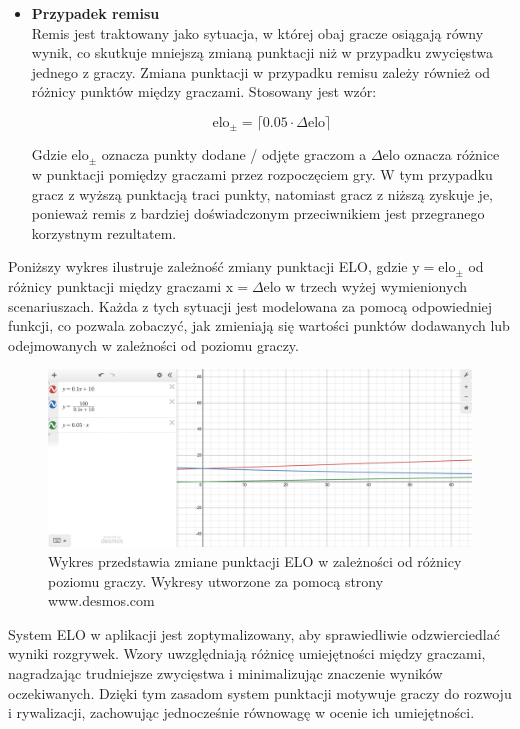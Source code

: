 \documentclass[12pt,a4paper]{article}
\begin{document}
\begin{itemize}
    \item \textbf{Przypadek remisu}\\
    Remis jest traktowany jako sytuacja, w której obaj gracze osiągają równy wynik, co skutkuje mniejszą zmianą punktacji niż w przypadku zwycięstwa jednego z graczy. Zmiana punktacji w przypadku remisu zależy również od różnicy punktów między graczami. Stosowany jest wzór:

    \[ \text{elo}_{\pm} = \lceil 0.05 \cdot \Delta \text{elo} \rceil \]

    Gdzie $ \text{elo}_{\pm} $ oznacza punkty dodane / odjęte graczom a $ \Delta \text{elo} $ oznacza różnice w punktacji pomiędzy graczami przez rozpoczęciem gry.     W tym przypadku gracz z wyższą punktacją traci punkty, natomiast gracz z niższą zyskuje je, ponieważ remis z bardziej doświadczonym przeciwnikiem jest przegranego korzystnym rezultatem.

\end{itemize}

\newpage


\noindent
Poniższy wykres ilustruje zależność zmiany punktacji ELO, gdzie $ \text{y} = \text{elo}_{\pm} $ od różnicy punktacji między graczami $ \text{x} = \Delta \text{elo} $  w trzech wyżej wymienionych scenariuszach. Każda z tych sytuacji jest modelowana za pomocą odpowiedniej funkcji, co pozwala zobaczyć, jak zmieniają się wartości punktów dodawanych lub odejmowanych w zależności od poziomu graczy.

\vspace{0.5cm}
\begin{figure}[h!]
    \centering
    \includegraphics[width=1\textwidth]{images/graf_elo_calc.png}
    \caption{Wykres przedstawia zmiane punktacji ELO w zależności od różnicy poziomu graczy. Wykresy utworzone za pomocą strony www.desmos.com}
\end{figure}
\vspace{0.5cm}

\noindent
System ELO w aplikacji jest zoptymalizowany, aby sprawiedliwie odzwierciedlać wyniki rozgrywek. Wzory uwzględniają różnicę umiejętności między graczami, nagradzając trudniejsze zwycięstwa i minimalizując znaczenie wyników oczekiwanych. Dzięki tym zasadom system punktacji motywuje graczy do rozwoju i rywalizacji, zachowując jednocześnie równowagę w ocenie ich umiejętności.
\\\\
\end{document}
